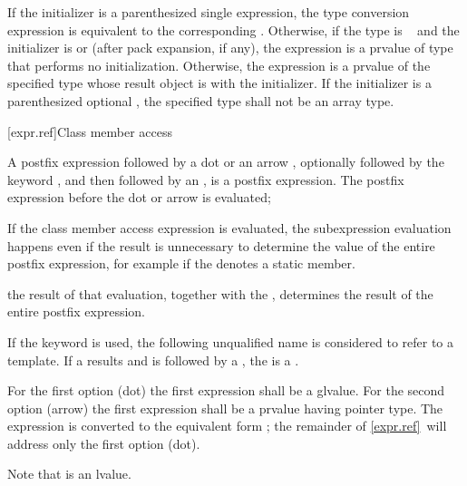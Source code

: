 \pnum
If the initializer is a parenthesized single expression,
the type conversion expression is equivalent
to the corresponding .
%
Otherwise, if the type is \cv{}~
and the initializer is \tcode{()} or \tcode{\{\}}
(after pack expansion, if any),
the expression is a prvalue of type 
that performs no initialization.
Otherwise,
the expression is a prvalue of the specified type
whose result object is 
with the initializer.
If the initializer is a parenthesized optional ,
the specified type shall not be an array type.

[expr.ref]{Class member access}

\pnum
{}%
%
%
%
%
%
%
%
%
%
A postfix expression followed by a dot  or an arrow \tcode{->},
optionally followed by the keyword
, and then followed by an
, is a postfix expression. The postfix
expression before the dot or arrow is evaluated;
\begin{footnote}
If the class member
access expression is evaluated, the subexpression evaluation happens even if the
result is unnecessary to determine
the value of the entire postfix expression, for example if the
 denotes a static member.
\end{footnote}
the result of that evaluation, together with the
, determines the result of the entire postfix
expression.
\begin{note}
If the keyword  is used,
the following unqualified name
is considered to refer to a template.
If a  results and is followed by a \tcode{::},
the  is a .
\end{note}

\pnum
{}%
For the first option (dot) the first expression shall be a glvalue.
For the second option (arrow) the first expression
shall be a prvalue having pointer type.
The expression  is
converted to the equivalent form ; the remainder of
\ref{expr.ref}~will address only the first option (dot).
\begin{footnote}
Note that
 is an lvalue.
\end{footnote}


